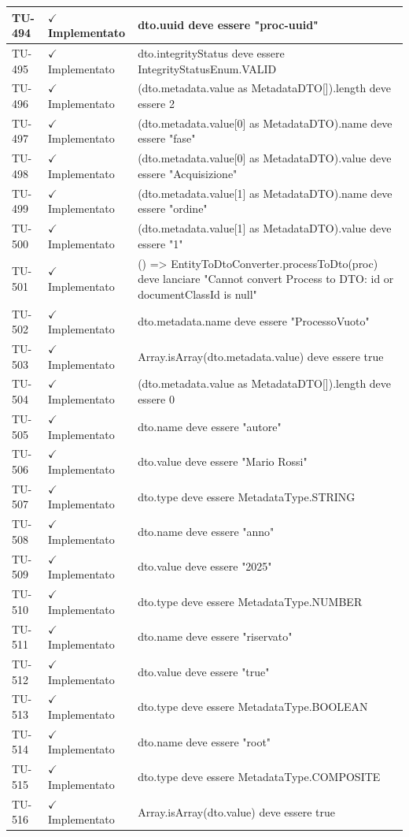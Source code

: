 ﻿\documentclass[a4paper,12pt]{article}
\newcommand{\ok}{\textcolor{green!60!black}{$\checkmark$ Implementato}}
\begin{document}
\begin{longtable}{|p{2cm}|p{3.5cm}|p{9.5cm}|}
\hline
TU-494 & \ok & dto.uuid deve essere "proc-uuid" \\
\hline
TU-495 & \ok & dto.integrityStatus deve essere IntegrityStatusEnum.VALID \\
\hline
TU-496 & \ok & (dto.metadata.value as MetadataDTO[]).length deve essere 2 \\
\hline
TU-497 & \ok & (dto.metadata.value[0] as MetadataDTO).name deve essere "fase" \\
\hline
TU-498 & \ok & (dto.metadata.value[0] as MetadataDTO).value deve essere "Acquisizione" \\
\hline
TU-499 & \ok & (dto.metadata.value[1] as MetadataDTO).name deve essere "ordine" \\
\hline
TU-500 & \ok & (dto.metadata.value[1] as MetadataDTO).value deve essere "1" \\
\hline
TU-501 & \ok & () => EntityToDtoConverter.processToDto(proc) deve lanciare "Cannot convert Process to DTO: id or documentClassId is null" \\
\hline
TU-502 & \ok & dto.metadata.name deve essere "ProcessoVuoto" \\
\hline
TU-503 & \ok & Array.isArray(dto.metadata.value) deve essere true \\
\hline
TU-504 & \ok & (dto.metadata.value as MetadataDTO[]).length deve essere 0 \\
\hline
TU-505 & \ok & dto.name deve essere "autore" \\
\hline
TU-506 & \ok & dto.value deve essere "Mario Rossi" \\
\hline
TU-507 & \ok & dto.type deve essere MetadataType.STRING \\
\hline
TU-508 & \ok & dto.name deve essere "anno" \\
\hline
TU-509 & \ok & dto.value deve essere "2025" \\
\hline
TU-510 & \ok & dto.type deve essere MetadataType.NUMBER \\
\hline
TU-511 & \ok & dto.name deve essere "riservato" \\
\hline
TU-512 & \ok & dto.value deve essere "true" \\
\hline
TU-513 & \ok & dto.type deve essere MetadataType.BOOLEAN \\
\hline
TU-514 & \ok & dto.name deve essere "root" \\
\hline
TU-515 & \ok & dto.type deve essere MetadataType.COMPOSITE \\
\hline
TU-516 & \ok & Array.isArray(dto.value) deve essere true \\

\end{longtable}
\end{document}

